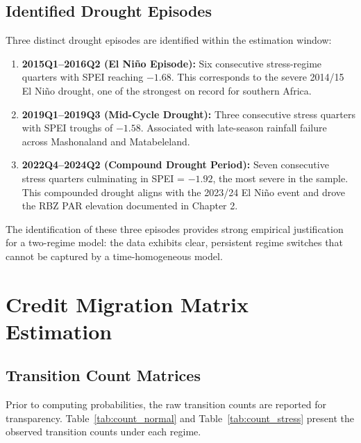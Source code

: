 \documentclass[12pt,a4paper]{article}
\begin{document}
\subsection{Identified Drought Episodes}

Three distinct drought episodes are identified within the estimation window:

\begin{enumerate}[noitemsep]
    \item \textbf{2015Q1--2016Q2 (El Niño Episode):} Six consecutive stress-regime quarters with SPEI reaching $-1.68$. This corresponds to the severe 2014/15 El Niño drought, one of the strongest on record for southern Africa.
    \item \textbf{2019Q1--2019Q3 (Mid-Cycle Drought):} Three consecutive stress quarters with SPEI troughs of $-1.58$. Associated with late-season rainfall failure across Mashonaland and Matabeleland.
    \item \textbf{2022Q4--2024Q2 (Compound Drought Period):} Seven consecutive stress quarters culminating in SPEI = $-1.92$, the most severe in the sample. This compounded drought aligns with the 2023/24 El Niño event and drove the RBZ PAR elevation documented in Chapter 2.
\end{enumerate}

The identification of these three episodes provides strong empirical justification for a two-regime model: the data exhibits clear, persistent regime switches that cannot be captured by a time-homogeneous model.

\section{Credit Migration Matrix Estimation}

\subsection{Transition Count Matrices}

Prior to computing probabilities, the raw transition counts are reported for transparency. Table~\ref{tab:count_normal} and Table~\ref{tab:count_stress} present the observed transition counts under each regime.
\end{document}
